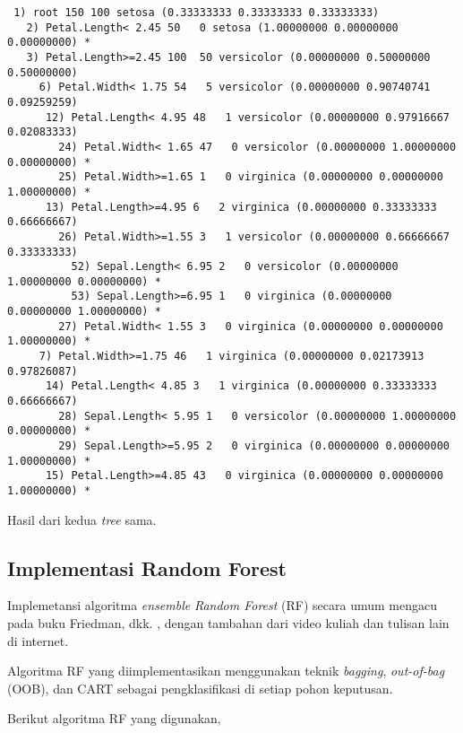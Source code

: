 \begin{lstlisting}
 1) root 150 100 setosa (0.33333333 0.33333333 0.33333333)
   2) Petal.Length< 2.45 50   0 setosa (1.00000000 0.00000000 0.00000000) *
   3) Petal.Length>=2.45 100  50 versicolor (0.00000000 0.50000000 0.50000000)
     6) Petal.Width< 1.75 54   5 versicolor (0.00000000 0.90740741 0.09259259)
      12) Petal.Length< 4.95 48   1 versicolor (0.00000000 0.97916667 0.02083333)
        24) Petal.Width< 1.65 47   0 versicolor (0.00000000 1.00000000 0.00000000) *
        25) Petal.Width>=1.65 1   0 virginica (0.00000000 0.00000000 1.00000000) *
      13) Petal.Length>=4.95 6   2 virginica (0.00000000 0.33333333 0.66666667)
        26) Petal.Width>=1.55 3   1 versicolor (0.00000000 0.66666667 0.33333333)
          52) Sepal.Length< 6.95 2   0 versicolor (0.00000000 1.00000000 0.00000000) *
          53) Sepal.Length>=6.95 1   0 virginica (0.00000000 0.00000000 1.00000000) *
        27) Petal.Width< 1.55 3   0 virginica (0.00000000 0.00000000 1.00000000) *
     7) Petal.Width>=1.75 46   1 virginica (0.00000000 0.02173913 0.97826087)
      14) Petal.Length< 4.85 3   1 virginica (0.00000000 0.33333333 0.66666667)
        28) Sepal.Length< 5.95 1   0 versicolor (0.00000000 1.00000000 0.00000000) *
        29) Sepal.Length>=5.95 2   0 virginica (0.00000000 0.00000000 1.00000000) *
      15) Petal.Length>=4.85 43   0 virginica (0.00000000 0.00000000 1.00000000) *
\end{lstlisting}

Hasil dari kedua \textit{tree} sama.

\subsection{Implementasi Random Forest}

Implemetansi algoritma \textit{ensemble} \textit{Random Forest} (RF) secara
umum mengacu pada buku Friedman, dkk. \cite{friedman2001elements}, dengan
tambahan dari video kuliah dan tulisan lain di internet.

Algoritma RF yang diimplementasikan menggunakan teknik \textit{bagging},
\textit{out-of-bag} (OOB), dan CART sebagai pengklasifikasi di setiap pohon
keputusan.

\clearpage

Berikut algoritma RF yang digunakan,

